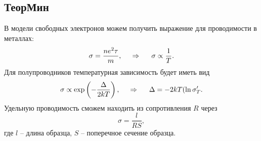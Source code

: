 \subsection*{ТеорМин}


В модели свободных электронов можем получить выражение для проводимости в металлах:
\begin{equation*}
    \sigma = \frac{n e^2 \tau}{m},
    \hspace{0.5cm} \Rightarrow \hspace{0.5cm}
    \sigma \propto \frac{1}{T}.
\end{equation*}
Для полупроводников температурная зависимость будет иметь вид
\begin{equation*}
    \sigma \propto \exp\left(-\frac{\Delta}{2 kT}\right),
    \hspace{0.5cm} \Rightarrow \hspace{0.5cm}
    \Delta = - 2 k T (\ln \sigma'_T.
\end{equation*}
Удельную проводимость сможем находить из сопротивления $R$ через
\begin{equation*}
    \sigma = \frac{l}{R S},
\end{equation*}
где $l$ -- длина образца, $S$ -- поперечное сечение образца.